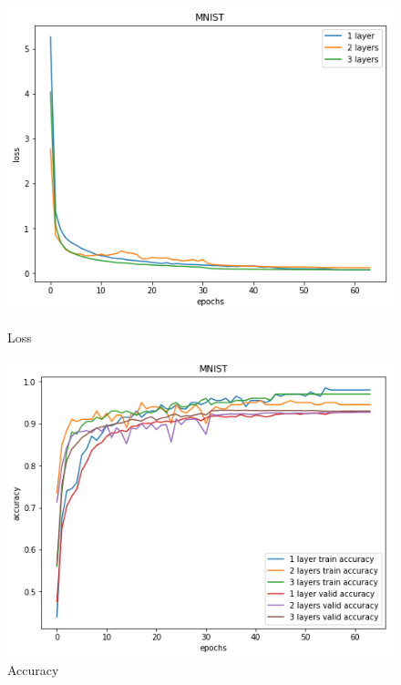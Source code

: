 \documentclass{article}
\begin{document}
\begin{figure}[!htb]
	\includegraphics[width=\linewidth]{../output_plots/part_1_task_1_loss.png}
	\caption{Loss}\label{fig:part_1_task_1_loss}
	\endminipage\hfill
	\includegraphics[width=\linewidth]{../output_plots/part_1_task_1_accuracy.png}
	\caption{Accuracy}\label{fig:part_1_task_1_accuracy}
	\endminipage\hfill

\end{figure}
\end{document}
